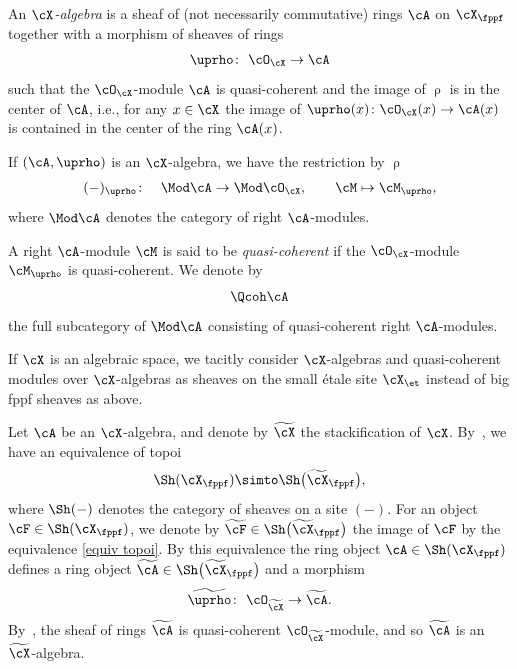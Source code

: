  \begin{dfn} An {\it ${\cX}$-algebra} is a sheaf of (not necessarily commutative) rings $\cA$ on $\cX_{\fppf}$ together with a morphism of sheaves of rings
 \begin{gather*}
 \uprho\colon\ \cO_{\cX}\to \cA
 \end{gather*}
 such that the $\cO_{\cX}$-module $\cA$ is quasi-coherent and the image of $\uprho$ is in the center of $\cA$, i.e., for any $x\in \cX$ the image of $\uprho(x)\colon \cO_{\cX}(x)\to \cA(x)$ is contained in the center of the ring $\cA(x)$.
\end{dfn}

 If $(\cA,\uprho)$ is an $\cX$-algebra, we have the restriction by $\uprho$
 \begin{gather*}
 (-)_{\uprho}\colon\quad \Mod\cA\to \Mod\cO_{\cX}, \qquad \cM\mapsto \cM_{\uprho},
 \end{gather*}
 where $ \Mod\cA$ denotes the category of right $\cA$-modules.
 \begin{dfn} A right $\cA$-module $\cM$ is said to be {\it quasi-coherent} if the $\cO_{\cX}$-module $\cM_{\uprho}$ is quasi-coherent. We denote by
 \begin{gather*}
 \Qcoh\cA
 \end{gather*}
 the full subcategory of $\Mod\cA$ consisting of quasi-coherent right $\cA$-modules.
 \end{dfn}

 \begin{rem}
 If $\cX$ is an algebraic space, we tacitly consider $\cX$-algebras and quasi-coherent modules over $\cX$-algebras as sheaves on the small \'etale site $\cX_{\et}$ instead of big fppf sheaves as above.
 \end{rem}



Let $\cA$ be an $\cX$-algebra, and denote by $\widetilde{\cX}$ the stackification of $\cX$. By~\cite[Lemma~12.1; 06WQ]{stacks}, we have an equivalence of topoi
\begin{equation}\label{equiv topoi}
\Sh(\cX_{\fppf})\simto \Sh\big(\widetilde{\cX}_{\fppf}\big),
\end{equation}
where $\Sh(-)$ denotes the category of sheaves on a site $(-)$. For an object $\cF\in \Sh(\cX_{\fppf})$, we denote by $\widetilde{\cF}\in\Sh\big(\widetilde{\cX}_{\fppf}\big)$ the image of $\cF$ by the equivalence \eqref{equiv topoi}.
By this equivalence the ring object $\cA\in\Sh(\cX_{\fppf})$ defines a ring object $\widetilde{\cA}\in\Sh\big(\widetilde{\cX}_{\fppf}\big)$ and a morphism
\begin{gather*}
\widetilde{\uprho}\colon\ \cO_{\widetilde{\cX}}\to \widetilde{\cA}.
\end{gather*}
By~\cite[Lemma~12.2; 06WR]{stacks}, the sheaf of rings $\widetilde{\cA}$ is quasi-coherent $\cO_{\widetilde{\cX}}$-module, and so $\widetilde{\cA}$ is an~$\widetilde{\cX}$-algebra.




